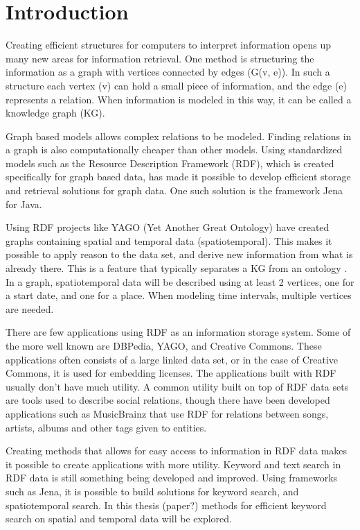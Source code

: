 \chapter{Introduction}
\label{cha:Introduction}

Creating efficient structures for computers to interpret information opens up many new areas for information retrieval. One method is structuring the information as a graph with vertices connected by edges (G(v, e)). In such a structure each vertex (v) can hold a small piece of information, and the edge (e) represents a relation. When information is modeled in this way, it can be called a knowledge graph (KG).

Graph based models allows complex relations to be modeled. Finding relations in a graph is also computationally cheaper than other models. Using standardized models such as the Resource Description Framework (RDF), which is created specifically for graph based data, has made it possible to develop efficient storage and retrieval solutions for graph data. One such solution is the framework Jena \citep{jena2} for Java.

Using RDF projects like YAGO (Yet Another Great Ontology) \citep{yago} have created graphs containing spatial and temporal data (spatiotemporal). This makes it possible to apply reason to the data set, and derive new information from what is already there. This is a feature that typically separates a KG from an ontology \citep{KGDefYago}. In a graph, spatiotemporal data will be described using at least 2 vertices, one for a start date, and one for a place. When modeling time intervals, multiple vertices are needed.

There are few applications using RDF as an information storage system. Some of the more well known are DBPedia, YAGO, and Creative Commons. These applications often consists of a large linked data set, or in the case of Creative Commons, it is used for embedding licenses. The applications built with RDF usually don't have much utility. A common utility built on top of RDF data sets are tools used to describe social relations, though there have been developed applications such as MusicBrainz that use RDF for relations between songs, artists, albums and other tags given to entities.

Creating methods that allows for easy access to information in RDF data makes it possible to create applications with more utility. Keyword and text search in RDF data is still something being developed and improved. Using frameworks such as Jena, it is possible to build solutions for keyword search, and spatiotemporal search. In this thesis (paper?) methods for efficient keyword search on spatial and temporal data will be explored.


